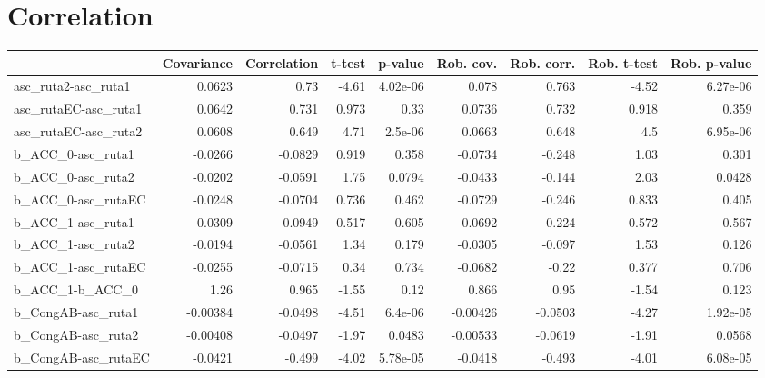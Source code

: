 \section{Correlation}
\begin{tabular}{lrrrrrrrr}
\toprule
{} &  Covariance &  Correlation &  t-test &  p-value &  Rob. cov. &  Rob. corr. &  Rob. t-test &  Rob. p-value \\
\midrule
asc\_ruta2-asc\_ruta1  &      0.0623 &         0.73 &   -4.61 & 4.02e-06 &      0.078 &       0.763 &        -4.52 &      6.27e-06 \\
asc\_rutaEC-asc\_ruta1 &      0.0642 &        0.731 &   0.973 &     0.33 &     0.0736 &       0.732 &        0.918 &         0.359 \\
asc\_rutaEC-asc\_ruta2 &      0.0608 &        0.649 &    4.71 &  2.5e-06 &     0.0663 &       0.648 &          4.5 &      6.95e-06 \\
b\_ACC\_0-asc\_ruta1    &     -0.0266 &      -0.0829 &   0.919 &    0.358 &    -0.0734 &      -0.248 &         1.03 &         0.301 \\
b\_ACC\_0-asc\_ruta2    &     -0.0202 &      -0.0591 &    1.75 &   0.0794 &    -0.0433 &      -0.144 &         2.03 &        0.0428 \\
b\_ACC\_0-asc\_rutaEC   &     -0.0248 &      -0.0704 &   0.736 &    0.462 &    -0.0729 &      -0.246 &        0.833 &         0.405 \\
b\_ACC\_1-asc\_ruta1    &     -0.0309 &      -0.0949 &   0.517 &    0.605 &    -0.0692 &      -0.224 &        0.572 &         0.567 \\
b\_ACC\_1-asc\_ruta2    &     -0.0194 &      -0.0561 &    1.34 &    0.179 &    -0.0305 &      -0.097 &         1.53 &         0.126 \\
b\_ACC\_1-asc\_rutaEC   &     -0.0255 &      -0.0715 &    0.34 &    0.734 &    -0.0682 &       -0.22 &        0.377 &         0.706 \\
b\_ACC\_1-b\_ACC\_0      &        1.26 &        0.965 &   -1.55 &     0.12 &      0.866 &        0.95 &        -1.54 &         0.123 \\
b\_CongAB-asc\_ruta1   &    -0.00384 &      -0.0498 &   -4.51 &  6.4e-06 &   -0.00426 &     -0.0503 &        -4.27 &      1.92e-05 \\
b\_CongAB-asc\_ruta2   &    -0.00408 &      -0.0497 &   -1.97 &   0.0483 &   -0.00533 &     -0.0619 &        -1.91 &        0.0568 \\
b\_CongAB-asc\_rutaEC  &     -0.0421 &       -0.499 &   -4.02 & 5.78e-05 &    -0.0418 &      -0.493 &        -4.01 &      6.08e-05 \\

\end{tabular}
